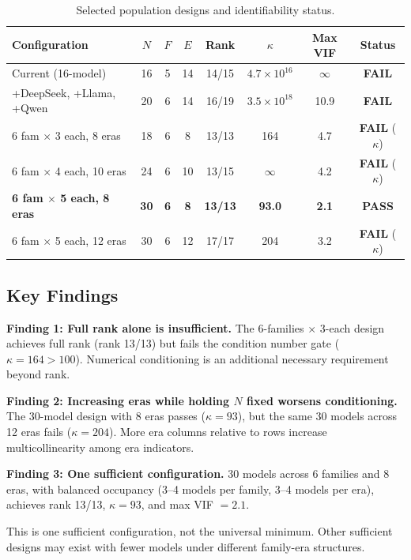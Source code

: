 \documentclass[journal]{IEEEtran}
\begin{document}
\begin{table}[!t]
\centering
\caption{Selected population designs and identifiability status.}
\label{tab:design_sweep}
\begin{tabular}{lccccccc}
\toprule
Configuration & $N$ & $F$ & $E$ & Rank & $\kappa$ & Max VIF & Status \\
\midrule
Current (16-model) & 16 & 5 & 14 & 14/15 & $4.7\times10^{16}$ & $\infty$ & \textbf{FAIL} \\
+DeepSeek, +Llama, +Qwen & 20 & 6 & 14 & 16/19 & $3.5\times10^{18}$ & 10.9 & \textbf{FAIL} \\
6 fam $\times$ 3 each, 8 eras & 18 & 6 & 8 & 13/13 & 164 & 4.7 & \textbf{FAIL} ($\kappa$) \\
6 fam $\times$ 4 each, 10 eras & 24 & 6 & 10 & 13/15 & $\infty$ & 4.2 & \textbf{FAIL} ($\kappa$) \\
\textbf{6 fam $\times$ 5 each, 8 eras} & \textbf{30} & \textbf{6} & \textbf{8} & \textbf{13/13} & \textbf{93.0} & \textbf{2.1} & \textbf{PASS} \\
6 fam $\times$ 5 each, 12 eras & 30 & 6 & 12 & 17/17 & 204 & 3.2 & \textbf{FAIL} ($\kappa$) \\
\bottomrule
\end{tabular}
\end{table}

\subsection{Key Findings}

\textbf{Finding 1: Full rank alone is insufficient.} The 6-families $\times$ 3-each design achieves full rank (rank 13/13) but fails the condition number gate ($\kappa = 164 > 100$). Numerical conditioning is an additional necessary requirement beyond rank.

\textbf{Finding 2: Increasing eras while holding $N$ fixed worsens conditioning.} The 30-model design with 8 eras passes ($\kappa = 93$), but the same 30 models across 12 eras fails ($\kappa = 204$). More era columns relative to rows increase multicollinearity among era indicators.

\textbf{Finding 3: One sufficient configuration.} 30 models across 6 families and 8 eras, with balanced occupancy (3--4 models per family, 3--4 models per era), achieves rank 13/13, $\kappa = 93$, and max VIF $= 2.1$.

This is one sufficient configuration, not the universal minimum. Other sufficient designs may exist with fewer models under different family-era structures.
\end{document}
